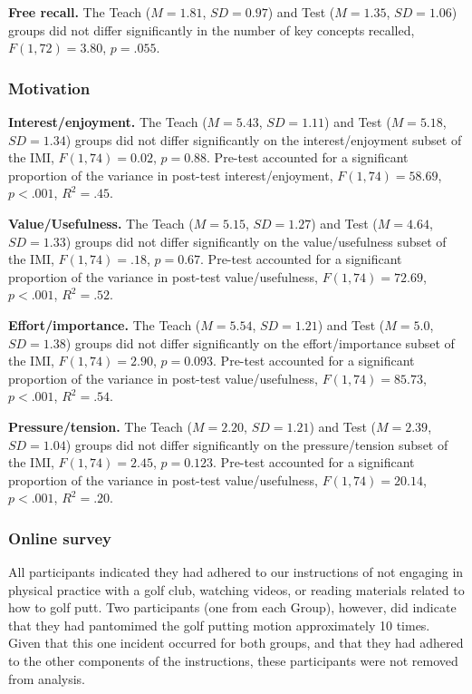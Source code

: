\documentclass[
  english,
  man,floatsintext]{apa7}
\begin{document}
\textbf{Free recall.} The Teach (\(M = 1.81\), \(SD = 0.97\)) and Test (\(M = 1.35\), \(SD = 1.06\)) groups did not differ significantly in the number of key concepts recalled, \(F(1, 72) = 3.80\), \(p = .055\).

\hypertarget{motivation}{%
\subsubsection{Motivation}\label{motivation}}

\textbf{Interest/enjoyment.} The Teach (\(M = 5.43\), \(SD = 1.11\)) and Test (\(M = 5.18\), \(SD = 1.34\)) groups did not differ significantly on the interest/enjoyment subset of the IMI, \(F(1, 74) = 0.02\), \(p = 0.88\). Pre-test accounted for a significant proportion of the variance in post-test interest/enjoyment, \(F(1,74) = 58.69\), \(p < .001\), \(R^{2} = .45\).

\textbf{Value/Usefulness.} The Teach (\(M = 5.15\), \(SD = 1.27\)) and Test (\(M = 4.64\), \(SD = 1.33\)) groups did not differ significantly on the value/usefulness subset of the IMI, \(F(1,74) = .18\), \(p = 0.67\). Pre-test accounted for a significant proportion of the variance in post-test value/usefulness, \(F(1,74) = 72.69\), \(p < .001\), \(R^{2} = .52\).

\textbf{Effort/importance.} The Teach (\(M = 5.54\), \(SD = 1.21\)) and Test (\(M = 5.0\), \(SD = 1.38\)) groups did not differ significantly on the effort/importance subset of the IMI, \(F(1,74) = 2.90\), \(p = 0.093\). Pre-test accounted for a significant proportion of the variance in post-test value/usefulness, \(F(1,74) = 85.73\), \(p < .001\), \(R^{2} = .54\).

\textbf{Pressure/tension.} The Teach (\(M = 2.20\), \(SD = 1.21\)) and Test (\(M = 2.39\), \(SD = 1.04\)) groups did not differ significantly on the pressure/tension subset of the IMI, \(F(1,74) = 2.45\), \(p = 0.123\). Pre-test accounted for a significant proportion of the variance in post-test value/usefulness, \(F(1,74) = 20.14\), \(p < .001\), \(R^{2} = .20\).

\hypertarget{online-survey}{%
\subsubsection{Online survey}\label{online-survey}}

All participants indicated they had adhered to our instructions of not engaging in physical practice with a golf club, watching videos, or reading materials related to how to golf putt. Two participants (one from each Group), however, did indicate that they had pantomimed the golf putting motion approximately 10 times. Given that this one incident occurred for both groups, and that they had adhered to the other components of the instructions, these participants were not removed from analysis.
\end{document}
